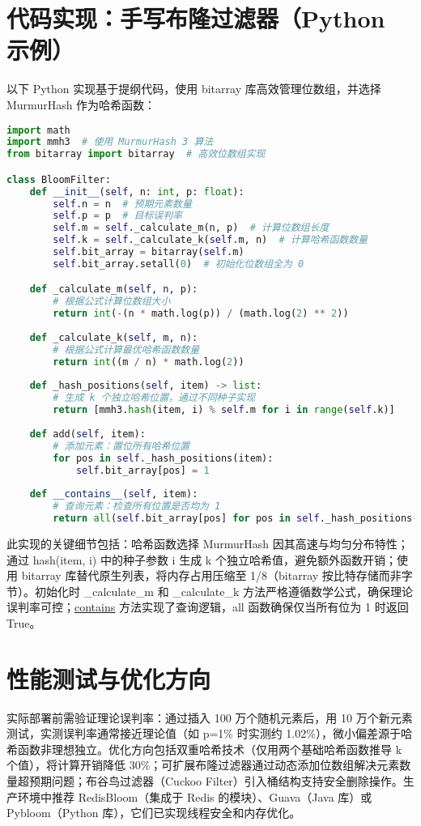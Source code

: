 \chapter{代码实现：手写布隆过滤器（Python 示例）}
以下 Python 实现基于提纲代码，使用 bitarray 库高效管理位数组，并选择 MurmurHash 作为哈希函数：\par
\begin{lstlisting}[language=python]
import math
import mmh3  # 使用 MurmurHash 3 算法
from bitarray import bitarray  # 高效位数组实现

class BloomFilter:
    def __init__(self, n: int, p: float):
        self.n = n  # 预期元素数量
        self.p = p  # 目标误判率
        self.m = self._calculate_m(n, p)  # 计算位数组长度
        self.k = self._calculate_k(self.m, n)  # 计算哈希函数数量
        self.bit_array = bitarray(self.m)
        self.bit_array.setall(0)  # 初始化位数组全为 0

    def _calculate_m(self, n, p):
        # 根据公式计算位数组大小
        return int(-(n * math.log(p)) / (math.log(2) ** 2))
    
    def _calculate_k(self, m, n):
        # 根据公式计算最优哈希函数数量
        return int((m / n) * math.log(2))
    
    def _hash_positions(self, item) -> list:
        # 生成 k 个独立哈希位置，通过不同种子实现
        return [mmh3.hash(item, i) % self.m for i in range(self.k)]
    
    def add(self, item):
        # 添加元素：置位所有哈希位置
        for pos in self._hash_positions(item):
            self.bit_array[pos] = 1
    
    def __contains__(self, item):
        # 查询元素：检查所有位置是否均为 1
        return all(self.bit_array[pos] for pos in self._hash_positions(item))
\end{lstlisting}
此实现的关键细节包括：哈希函数选择 MurmurHash 因其高速与均匀分布特性；通过 hash(item, i) 中的种子参数 i 生成 k 个独立哈希值，避免额外函数开销；使用 bitarray 库替代原生列表，将内存占用压缩至 1/8（bitarray 按比特存储而非字节）。初始化时 \_{}calculate\_{}m 和 \_{}calculate\_{}k 方法严格遵循数学公式，确保理论误判率可控；\underline{\underline{contains}} 方法实现了查询逻辑，all 函数确保仅当所有位为 1 时返回 True。\par
\chapter{性能测试与优化方向}
实际部署前需验证理论误判率：通过插入 100 万个随机元素后，用 10 万个新元素测试，实测误判率通常接近理论值（如 p=1\%{} 时实测约 1.02\%{}），微小偏差源于哈希函数非理想独立。优化方向包括双重哈希技术（仅用两个基础哈希函数推导 k 个值），将计算开销降低 30\%{}；可扩展布隆过滤器通过动态添加位数组解决元素数量超预期问题；布谷鸟过滤器（Cuckoo Filter）引入桶结构支持安全删除操作。生产环境中推荐 RedisBloom（集成于 Redis 的模块）、Guava（Java 库）或 Pybloom（Python 库），它们已实现线程安全和内存优化。\par
